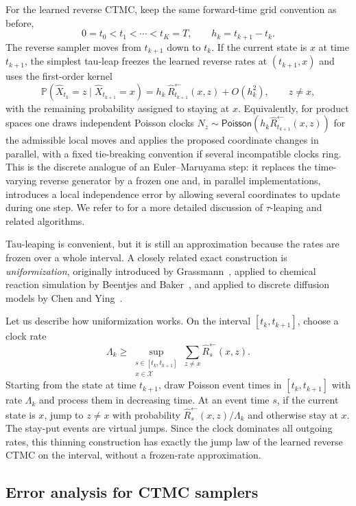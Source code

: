 \documentclass[10pt,a4paper]{amsart}
\numberwithin{equation}{section}
\newcommand{\Pp}{\mathbb{P}}
\newcommand{\cX}{\mathcal{X}}
\newcommand{\wh}[1]{\widehat{#1}}
\newcommand{\Poi}{\mathsf{Poisson}}
\begin{document}
For the learned reverse CTMC, keep the same forward-time grid convention as
before,
\[
    0=t_0<t_1<\cdots<t_K=T,
    \qquad h_k=t_{k+1}-t_k.
\]
The reverse sampler moves from $t_{k+1}$ down to $t_k$.  If the current state is
$x$ at time $t_{k+1}$, the simplest tau-leap freezes the learned reverse rates
at $(t_{k+1},x)$ and uses the first-order kernel
\[
    \Pp(\wh X_{t_k}=z\mid \wh X_{t_{k+1}}=x)
    =
    h_k\,\wh R_{t_{k+1}}^{\leftarrow}(x,z)
    +O(h_k^2),
    \qquad z\neq x,
\]
with the remaining probability assigned to staying at $x$.  Equivalently, for
product spaces one draws independent Poisson clocks
$N_z\sim\Poi(h_k\wh R_{t_{k+1}}^{\leftarrow}(x,z))$ for the admissible local
moves and applies the proposed coordinate changes in parallel, with a fixed
tie-breaking convention if several incompatible clocks ring.  This is the
discrete analogue of an Euler--Maruyama step: it replaces the time-varying
reverse generator by a frozen one and, in parallel implementations, introduces
a local independence error by allowing several coordinates to update during one
step.  We refer to \cite[Chapter~13]{e2019appliedstochastic} for a more detailed
discussion of $\tau$-leaping and related algorithms.

Tau-leaping is convenient, but it is still an approximation because the rates
are frozen over a whole interval.  A closely related exact construction is
\emph{uniformization}, originally introduced by
Grassmann~\cite{grassmann1977transient}, applied to chemical reaction
simulation by Beentjes and Baker~\cite{beentjes2019uniformisation}, and applied
to discrete diffusion models by Chen and Ying~\cite{chenying2024discrete}.

Let us describe how uniformization works.  On the interval
$[t_k,t_{k+1}]$, choose a clock rate
\[
    \Lambda_k
    \geq
    \sup_{\substack{s\in[t_k,t_{k+1}]\\ x\in\cX}}
    \sum_{z\neq x}\wh R_s^{\leftarrow}(x,z).
\]
Starting from the state at time $t_{k+1}$, draw Poisson event times in
$[t_k,t_{k+1}]$ with rate $\Lambda_k$ and process them in decreasing time.  At
an event time $s$, if the current state is $x$, jump to $z\neq x$ with
probability $\wh R_s^{\leftarrow}(x,z)/\Lambda_k$ and otherwise stay at $x$.
The stay-put events are virtual jumps.  Since the clock dominates all outgoing
rates, this thinning construction has exactly the jump law of the learned
reverse CTMC on the interval, without a frozen-rate approximation.

\subsection{Error analysis for CTMC samplers}
\label{subsec:ctmc-error-analysis}
\end{document}
